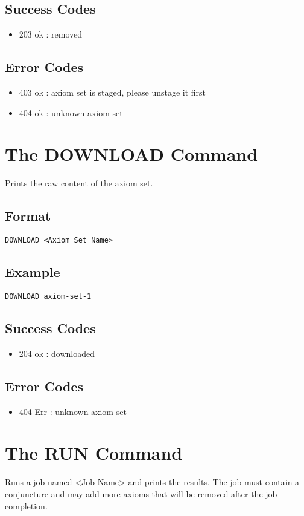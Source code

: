 \subsection{Success Codes}
\begin{itemize}
    \item 203 ok : removed
\end{itemize}
\subsection{Error Codes}
\begin{itemize}
    \item 403 ok : axiom set is staged, please unstage it first
    \item 404 ok : unknown axiom set
\end{itemize}
\clearpage

\section{The DOWNLOAD Command}
Prints the raw content of the axiom set.
\subsection{Format}
\begin{lstlisting}
DOWNLOAD <Axiom Set Name>
\end{lstlisting}
\subsection{Example}
\begin{lstlisting}
DOWNLOAD axiom-set-1
\end{lstlisting}
\subsection{Success Codes}
\begin{itemize}
    \item 204 ok : downloaded
\end{itemize}
\subsection{Error Codes}
\begin{itemize}
    \item 404 Err : unknown axiom set
\end{itemize}
\clearpage

\section{The RUN Command}
Runs a job named <Job Name> and prints the results. The job must contain a conjuncture and may add more axioms that will be removed after the job completion.
